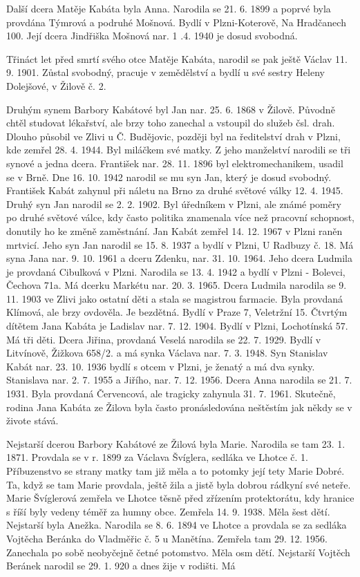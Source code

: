 \documentclass[../dejiny-rodu-prusiku.tex]{subfiles}
\begin{document}
Další dcera Matěje Kabáta byla Anna. Narodila se 21. 6. 1899 a poprvé byla provdána Týmrová a podruhé Mošnová. Bydlí v Plzni-Koterově, Na Hradčanech 100. Její dcera Jindřiška Mošnová nar. 1 .4. 1940 je dosud svobodná.

Třináct let před smrtí svého otce Matěje Kabáta, narodil se pak ještě Václav 11. 9. 1901. Zůstal svobodný, pracuje v zemědělství a bydlí u své sestry Heleny Dolejšové, v Žilově č. 2.

Druhým synem Barbory Kabátové byl Jan nar. 25. 6. 1868 v Žilově. Původně chtěl studovat lékařství, ale brzy toho zanechal a vstoupil do služeb čsl. drah. Dlouho působil ve Zlivi u Č. Budějovic, později byl na ředitelství drah v Plzni, kde zemřel 28. 4. 1944. Byl miláčkem své matky. Z jeho manželství narodili se tři synové a jedna dcera. František nar. 28. 11. 1896 byl elektromechanikem, usadil se v Brně. Dne 16. 10. 1942 narodil se mu syn Jan, který je dosud svobodný. František Kabát zahynul při náletu na Brno za druhé světové války 12. 4. 1945. Dru­hý syn Jan narodil se 2. 2. 1902. Byl úředníkem v Plzni, ale známé poměry po druhé světové válce, kdy často politika znamenala více než pracovní schopnost, donutily ho ke změně zaměstnání. Jan Kabát zemřel 14. 12. 1967 v Plzni raněn mrtvicí. Jeho syn Jan narodil se 15. 8. 1937 a bydlí v Plzni, U Radbuzy č. 18. Má syna Jana nar. 9. 10. 1961 a dceru Zdenku, nar. 31. 10. 1964. Jeho dcera Ludmila je provdaná Cibulková v Plzni. Narodila se 13. 4. 1942 a bydlí v Plzni - Bolevci, Čechova 71a. Má dcerku Markétu nar. 20. 3. 1965. Dcera Ludmila narodila se 9. 11. 1903 ve Zlivi jako ostat­ní děti a stala se magistrou farmacie. Byla provdaná Klí­mová, ale brzy ovdověla. Je bezdětná. Bydlí v Praze 7, Veletržní 15. Čtvrtým dítětem Jana Kabáta je Ladislav nar. 7. 12. 1904. Bydlí v Plzni, Lochotínská 57. Má tři děti. Dcera Jiřina, provdaná Veselá narodila se 22. 7. 1929. Bydlí v Litvíno­vě, Žižkova 658/2. a má synka Václava nar. 7. 3. 1948. Syn Stanislav Kabát nar. 23. 10. 1936 bydlí s otcem v Plzni, je ženatý a má dva synky. Stanislava nar. 2. 7. 1955 a Ji­řího, nar. 7. 12. 1956. Dcera Anna narodila se 21. 7. 1931. Byla provdaná Červencová, ale tragicky zahynula 31. 7. 1961. Skutečně, rodina Jana Kabáta ze Žilova byla často pronásledována neštěstím jak někdy se v živote stává.

Nejstarší dcerou Barbory Kabátové ze Žilová byla Marie. Narodila se tam 23. 1. 1871. Provdala se v r. 1899 za Václava Švíglera, sedláka ve Lhotce č. 1. Příbuzenstvo se stra­ny matky tam již měla a to potomky její tety Marie Dobré. Ta, když se tam Marie provdala, ještě žila a jistě byla dobrou rádkyní své neteře. Marie Švíglerová zemřela ve Lhotce těsně před zřízením protektorátu, kdy hranice s říší byly vedeny téměř za humny obce. Zemřela 14. 9. 1938. Měla šest dětí. Nejstarší byla Anežka. Narodila se 8. 6. 1894 ve Lhotce a provdala se za sedláka Vojtěcha Beránka do Vladměřic č. 5 u Manětína. Zemřela tam 29. 12. 1956. Zanechala po sobě ne­obyčejně četné potomstvo. Měla osm dětí. Nejstarší Vojtěch Beránek narodil se 29. 1. 920 a dnes žije v rodišti. Má
\end{document}
